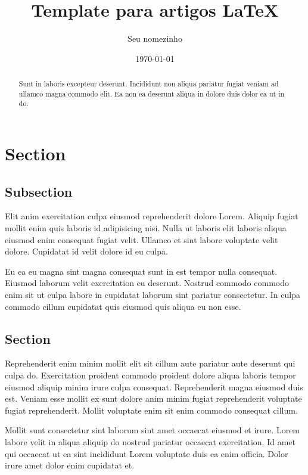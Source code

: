 \documentclass[12pt]{article}
\author{Seu nomezinho}
\title{Template para artigos LaTeX}
\date{\today}
\begin{document}
\maketitle

\begin{abstract}

Sunt in laboris excepteur deserunt. Incididunt non aliqua pariatur fugiat veniam ad ullamco magna commodo elit. Ea non ea deserunt aliqua in dolore duis dolor ea ut in do.

\end{abstract}

\section{Section}

\subsection{Subsection}

Elit anim exercitation culpa eiusmod reprehenderit dolore Lorem. Aliquip fugiat mollit enim quis laboris id adipisicing nisi. Nulla ut laboris elit laboris aliqua eiusmod enim consequat fugiat velit. Ullamco et sint labore voluptate velit dolore. Cupidatat id velit dolore id eu culpa.

Eu ea eu magna sint magna consequat sunt in est tempor nulla consequat. Eiusmod laborum velit exercitation eu deserunt. Nostrud commodo commodo enim sit ut culpa labore in cupidatat laborum sint pariatur consectetur. In culpa commodo cillum cupidatat quis eiusmod quis aliqua eu non esse.

\subsection{Section}

Reprehenderit enim minim mollit elit sit cillum aute pariatur aute deserunt qui culpa do. Exercitation proident commodo proident dolore aliqua laboris tempor eiusmod aliquip minim irure culpa consequat. Reprehenderit magna eiusmod duis est. Veniam esse mollit ex sunt dolore anim minim fugiat reprehenderit voluptate fugiat reprehenderit. Mollit voluptate enim sit enim commodo consequat cillum.

Mollit sunt consectetur sint laborum sint amet occaecat eiusmod et irure. Lorem labore velit in aliqua aliquip do nostrud pariatur occaecat exercitation. Id amet qui occaecat ut ea sint incididunt Lorem voluptate duis ea enim officia. Dolor irure amet dolor enim cupidatat et.
\end{document}
